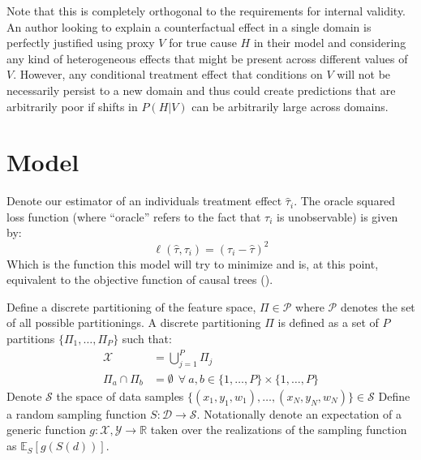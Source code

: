 \documentclass[a4paper,12pt]{article}
\theoremstyle{proposition}
\begin{document}
Note that this is completely orthogonal to the requirements for internal validity. An author looking to explain a counterfactual effect in a single domain is perfectly justified using proxy $V$ for true cause $H$ in their model and considering any kind of heterogeneous effects that might be present across different values of $V$. However, any conditional treatment effect that conditions on $V$ will not be necessarily persist to a new domain and thus could create predictions that are arbitrarily poor if shifts in $P(H | V)$ can be arbitrarily large across domains.


\section{ Model }

Denote our estimator of an individuals treatment effect $\hat{\tau}_i$. The oracle squared loss function (where ``oracle'' refers to the fact that $\tau_i$ is unobservable) is given by:
%
$$
\ell(\hat{\tau}, \tau_i) = (\tau_i - \hat{\tau})^2
$$
%
Which is the function this model will try to minimize and is, at this point, equivalent to the objective function of causal trees (\cite{Athey2016}).

Define a discrete partitioning of the feature space, $\Pi \in \mathcal{P}$ where $\mathcal{P}$ denotes the set of all possible partitionings. A discrete partitioning $\Pi$ is defined as a set of $P$ partitions $\{\Pi_1, \dots, \Pi_P\}$ such that:
%
\begin{align*}
\mathcal{X} &= \bigcup\limits_{j=1}^{P} \Pi_j \\
\Pi_a \cap \Pi_b &= \emptyset \ \ \forall \ a,b \in \{1,\dots,P\} \times \{1,\dots,P\}
\end{align*}
%
Denote $\mathcal{S}$ the space of data samples $\{(x_1,y_1,w_1),\dots,(x_N, y_N, w_N)\} \in \mathcal{S}$ Define a random sampling function $S: \mathcal{D} \rightarrow \mathcal{S}$. Notationally denote an expectation of a generic function $g: \mathcal{X}, \mathcal{Y} \rightarrow \mathbb{R}$ taken over the realizations of the sampling function as $\mathbb{E}_S[g(S(d))]$.
\end{document}
